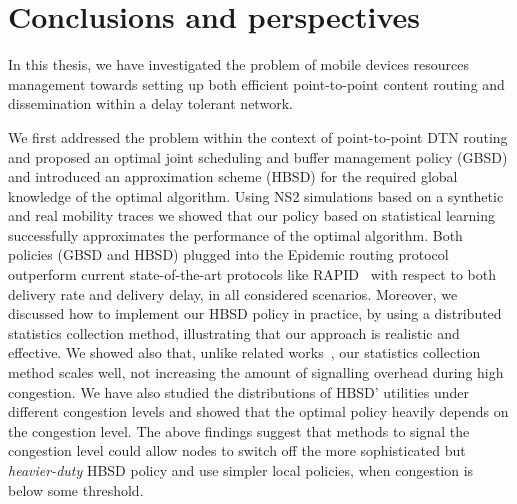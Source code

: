 \chapter{Conclusions and perspectives}
\label{chapter:conclusions}

In this thesis, we have investigated the problem of mobile devices resources management towards setting up both efficient point-to-point content routing and dissemination within a delay tolerant network.
  
We first addressed the problem within the context of point-to-point DTN routing and proposed an optimal joint scheduling and buffer management policy (GBSD) and introduced an approximation scheme (HBSD) for the required global knowledge of the optimal algorithm. Using NS2 simulations based on a synthetic and real mobility traces we showed that our policy based on statistical learning successfully approximates the performance of the optimal algorithm. Both policies (GBSD and HBSD) plugged into the Epidemic routing protocol outperform current state-of-the-art protocols like RAPID~\cite{Levine:Sigcomm07} with respect to both delivery rate and delivery delay, in all considered scenarios. Moreover, we discussed how to implement our HBSD policy in practice, by using a distributed statistics collection method, illustrating that our approach is realistic and effective. We showed also that, unlike related works~\cite{Levine:Sigcomm07, AOBM}, our statistics collection method scales well, not increasing the amount of signalling overhead during high congestion. We have also studied the distributions of HBSD' utilities under different congestion levels and showed that the optimal policy heavily depends on the congestion level. The above findings suggest that methods to signal the congestion level could allow nodes to switch off the more sophisticated but \emph{heavier-duty} HBSD policy and use simpler local policies, when congestion is below some threshold. 

